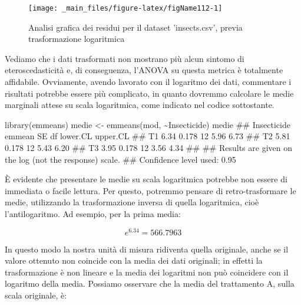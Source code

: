 \documentclass[a4paper,12pt,oneside]{book}
\newenvironment{Shaded}{\begin{snugshade}}{\end{snugshade}}
\newcommand{\SpecialCharTok}[1]{#1}
\newcommand{\StringTok}[1]{#1}
\newcommand{\DocumentationTok}[1]{#1}
\newcommand{\OtherTok}[1]{#1}
\newcommand{\FunctionTok}[1]{#1}
\newcommand{\NormalTok}[1]{#1}
\begin{document}
\begin{figure}

{\centering \texttt{[image: \_main\_files/figure-latex/figName112-1]} 

}

\caption{Analisi grafica dei residui per il dataset 'insects.csv', previa trasformazione logaritmica}\label{fig:figName112}
\end{figure}

Vediamo che i dati trasformati non mostrano più alcun sintomo di eteroscedasticità e, di conseguenza, l'ANOVA su questa metrica è totalmente affidabile. Ovviamente, avendo lavorato con il logaritmo dei dati, commentare i risultati potrebbe essere più complicato, in quanto dovremmo calcolare le medie marginali attese su scala logaritmica, come indicato nel codice sottostante.

\begin{Shaded}
\begin{Highlighting}[]
\FunctionTok{library}\NormalTok{(emmeans)}
\NormalTok{medie }\OtherTok{\textless{}{-}} \FunctionTok{emmeans}\NormalTok{(mod, }\SpecialCharTok{\textasciitilde{}}\NormalTok{Insecticide)}
\NormalTok{medie}
\DocumentationTok{\#\#  Insecticide emmean    SE df lower.CL upper.CL}
\DocumentationTok{\#\#  T1            6.34 0.178 12     5.96     6.73}
\DocumentationTok{\#\#  T2            5.81 0.178 12     5.43     6.20}
\DocumentationTok{\#\#  T3            3.95 0.178 12     3.56     4.34}
\DocumentationTok{\#\# }
\DocumentationTok{\#\# Results are given on the log (not the response) scale. }
\DocumentationTok{\#\# Confidence level used: 0.95}
\end{Highlighting}
\end{Shaded}

È evidente che presentare le medie su scala logaritmica potrebbe non essere di immediata o facile lettura. Per questo, potremmo pensare di retro-trasformare le medie, utilizzando la trasformazione inversa di quella logaritmica, cioè l'antilogaritmo. Ad esempio, per la prima media:

\[e^{6.34} = 566.7963\]

In questo modo la nostra unità di misura ridiventa quella originale, anche se il valore ottenuto non coincide con la media dei dati originali; in effetti la trasformazione è non lineare e la media dei logaritmi non può coincidere con il logaritmo della media. Possiamo osservare che la media del trattamento A, sulla scala originale, è:

\begin{Shaded}
\end{Shaded}
\end{document}
